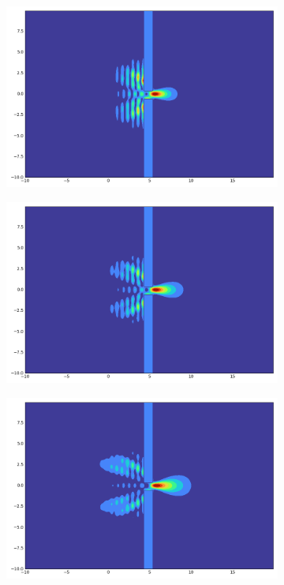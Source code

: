 \begin{figure}[h!]
\begin{subfigure}{0.3\linewidth}
    \end{subfigure}
    \begin{subfigure}{0.3\linewidth}
        \includegraphics[width=\linewidth]{10/600}
    \end{subfigure}
    \begin{subfigure}{0.3\linewidth}
        \includegraphics[width=\linewidth]{10/700}
    \end{subfigure}
    \begin{subfigure}{0.3\linewidth}
        \includegraphics[width=\linewidth]{10/800}

\end{subfigure}
\end{figure}
